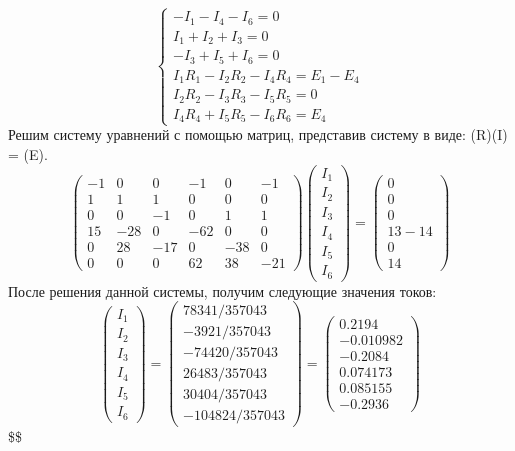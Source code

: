 \documentclass[
]{article}
\begin{document}
\[
\begin{cases}
-I_{1} - I_{4} - I_{6} = 0 \\ I_{1} + I_{2} + I_{3} = 0 \\ -I_{3} + I_{5} + I_{6} = 0 \\ I_{1}R_{1} - I_{2}R_{2} - I_{4}R_{4} = E_{1} - E_{4} \\ I_{2}R_{2} - I_{3}R_{3} - I_{5}R_{5} = 0 \\ I_{4}R_{4} + I_{5}R_{5} - I_{6}R_{6} = E_{4}
\end{cases}
\] Решим систему уравнений с помощью матриц, представив систему в виде:
(R)(I) = (E). \[
\begin{pmatrix}
-1 & 0 & 0 & -1 & 0 & -1 \\
1 & 1 & 1 & 0 & 0 & 0 \\
0 & 0 & -1 & 0 & 1 & 1 \\
15 & -28 & 0 & -62 & 0 & 0 \\
0 & 28 & -17 & 0 & -38 & 0 \\
0 & 0 & 0 & 62 & 38 & -21
\end{pmatrix}
\begin{pmatrix}
I_{1} \\
I_{2} \\
I_{3} \\
I_{4} \\
I_{5} \\
I_{6}
\end{pmatrix}
 = 
\begin{pmatrix}
0 \\
0 \\
0 \\
13 - 14 \\
0 \\
14
\end{pmatrix}
\] После решения данной системы, получим следующие значения токов: \[
\begin{pmatrix}
I_{1} \\
I_{2} \\
I_{3} \\
I_{4} \\
I_{5} \\
I_{6}
\end{pmatrix} = 
\begin{pmatrix}
  78341/357043 \\
  -3921/357043 \\
 -74420/357043 \\
  26483/357043 \\
  30404/357043 \\
-104824/357043
\end{pmatrix}
 = 
 \begin{pmatrix}
0.2194 \\
-0.010982 \\
-0.2084 \\
0.074173 \\
0.085155 \\
-0.2936
\end{pmatrix}
\] \$\$
\end{document}
